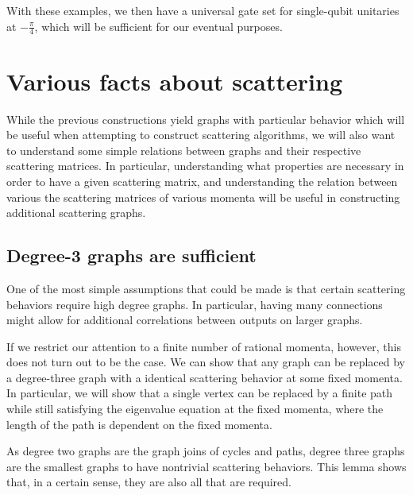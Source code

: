\documentclass[../thesis-main/thesis-main]{subfiles}
\begin{document}
With these examples, we then have a universal gate set for single-qubit unitaries at $-\frac{\pi}{4}$, which will be sufficient for our eventual purposes.  



\section{Various facts about scattering}

While the previous constructions yield graphs with particular behavior which will be useful when attempting to construct scattering algorithms, we will also want to understand some simple relations between graphs and their respective scattering matrices.  In particular, understanding what properties are necessary in order to have a given scattering matrix, and understanding the relation between various the scattering matrices of various momenta will be useful in constructing additional scattering graphs.

\subsection{Degree-3 graphs are sufficient}

One of the most simple assumptions that could be made is that certain scattering behaviors require high degree graphs.  In particular, having many connections might allow for additional correlations between outputs on larger graphs.  

If we restrict our attention to a finite number of rational momenta, however, this does not turn out to be the case.  We can show that any graph can be replaced by a degree-three graph with a identical scattering behavior at some fixed momenta.  In particular, we will show that a single vertex can be replaced by a finite path while still satisfying the eigenvalue equation at the fixed momenta, where the length of the path is dependent on the fixed momenta.

As degree two graphs are the graph joins of cycles and paths, degree three graphs are the smallest graphs to have nontrivial scattering behaviors.  This lemma shows that, in a certain sense, they are also all that are required.
\end{document}
